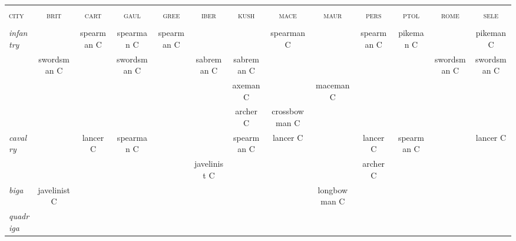 \documentclass{article}
\newcommand{\brit}{\textsc{\color{blue} brit}}
\newcommand{\cart}{\textsc{\color{blue} cart}}
\newcommand{\gaul}{\textsc{\color{blue} gaul}}
\newcommand{\gree}{\textsc{\color{blue} gree}}
\newcommand{\iber}{\textsc{\color{blue} iber}}
\newcommand{\kush}{\textsc{\color{blue} kush}}
\newcommand{\mace}{\textsc{\color{blue} mace}}
\newcommand{\maur}{\textsc{\color{blue} maur}}
\newcommand{\pers}{\textsc{\color{blue} pers}}
\newcommand{\ptol}{\textsc{\color{blue} ptol}}
\newcommand{\rome}{\textsc{\color{blue} rome}}
\newcommand{\sele}{\textsc{\color{blue} sele}}
\newcommand{\city}{\textsc{\color{blue} city}}
\begin{document}
\begin{landscape}
\begin{tabular}{l||c|c|c|c||c|c|c|c||c|c|c|c}
\hline
\hline
 &                &                &                &                &                &                &                &                &                &                &                &                \\
\city %
 & \brit          & \cart          & \gaul          & \gree          & \iber          & \kush          & \mace          & \maur          & \pers          & \ptol          & \rome          & \sele          \\
 &                &                &                &                &                &                &                &                &                &                &                &                \\
\hline
\hline\textit{infantry}
 &                & spearman C     & spearman C     & spearman C     &                &                & spearman C     &                & spearman C     & pikeman C      &                & pikeman C      \\
 & swordsman C    &                & swordsman C    &                & sabreman C     & sabreman C     &                &                &                &                & swordsman C    & swordsman C    \\
 &                &                &                &                &                & axeman C       &                & maceman C      &                &                &                &                \\
 &                &                &                &                &                & archer C       & crossbowman C  &                &                &                &                &                \\
\hline\textit{cavalry}
 &                & lancer C       & spearman C     &                &                & spearman C     & lancer C       &                & lancer C       & spearman C     &                & lancer C       \\
 &                &                &                &                & javelinist C   &                &                &                & archer C       &                &                &                \\
\hline\textit{biga}
 & javelinist C   &                &                &                &                &                &                & longbowman C   &                &                &                &                \\
\hline\textit{quadriga}

\end{tabular}
\end{landscape}
\end{document}
